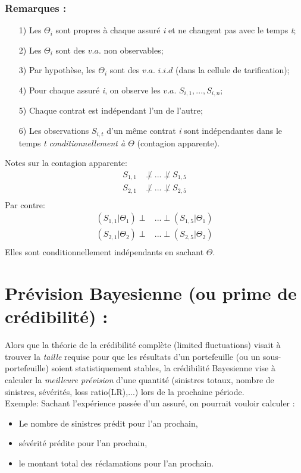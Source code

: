 \subsubsection*{Remarques :}
\begin{itemize}
\item[1)] Les $\Theta_i$ sont propres à chaque assuré \emph{i} et ne changent pas avec le temps \emph{t};
\item[2)] Les $\Theta_i$ sont des $v.a.$ non observables;
\item[3)] Par hypothèse, les $\Theta_i$ sont des $v.a.$ $i.i.d$ (dans la cellule de tarification);
\item[4)] Pour chaque assuré \emph{i}, on observe les $v.a.$ $S_{i,1}, ..., S_{i,n}$;
\item[5)] Chaque contrat est indépendant l'un de l'autre;
\item[6)] Les observations $S_{i,t}$ d'un même contrat \emph{i} sont indépendantes dans le temps \emph{t} \emph{conditionnellement à $\Theta$} (contagion apparente).
\end{itemize}
Notes sur la contagion apparente:
\begin{align*}
S_{1,1} & \not\perp ... \not\perp S_{1,5} \\
S_{2,1} & \not\perp ... \not\perp S_{2,5} \\
\end{align*}
Par contre:
\begin{align*}
(S_{1,1}|\Theta_1) \perp & ... \perp (S_{1,5}|\Theta_1) \\
(S_{2,1}|\Theta_2) \perp & ... \perp (S_{2,5}|\Theta_2) \\
\end{align*}
Elles sont conditionnellement indépendants en sachant $\Theta$.

\section{Prévision Bayesienne (ou prime de crédibilité) :}
Alors  que la théorie de la crédibilité complète (limited fluctuations) visait à trouver la \emph{taille} requise pour que les résultats d'un portefeuille (ou un sous-portefeuille) soient statistiquement stables, la crédibilité Bayesienne vise à calculer la \emph{meilleure prévision} d'une quantité (sinistres totaux, nombre de sinistres, sévérités, loss ratio(LR),...) lors de la prochaine période.
\\

Exemple:
Sachant l'expérience passée d'un assuré, on pourrait vouloir calculer :
\begin{itemize}
\item Le nombre de sinistres prédit pour l'an prochain,
\item sévérité prédite pour  l'an prochain,
\item le montant total des réclamations pour l'an prochain.
\end{itemize}

